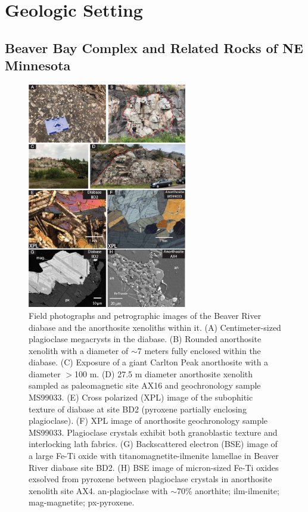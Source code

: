 \section{Geologic Setting}

\subsection{Beaver Bay Complex and Related Rocks of NE Minnesota}

\begin{figure}[h!]
\centering
\noindent\includegraphics[width=0.62\textwidth]{figure/Zhang2021/Field_photo.pdf}
\caption{\footnotesize{Field photographs and petrographic images of the Beaver River diabase and the anorthosite xenoliths within it. (A) Centimeter-sized plagioclase megacrysts in the diabase. (B) Rounded anorthosite xenolith with a diameter of $\sim$7 meters fully enclosed within the diabase. (C) Exposure of a giant Carlton Peak anorthosite with a diameter $>$100 m. (D) 27.5 m diameter anorthosite xenolith sampled as paleomagnetic site AX16 and geochronology sample MS99033. (E) Cross polarized (XPL) image of the subophitic texture of diabase at site BD2 (pyroxene partially enclosing plagioclase). (F) XPL image of anorthosite geochronology sample MS99033. Plagioclase crystals exhibit both granoblastic texture and interlocking lath fabrics. (G) Backscattered electron (BSE) image of a large Fe-Ti oxide with titanomagnetite-ilmenite lamellae in Beaver River diabase site BD2. (H) BSE image of micron-sized Fe-Ti oxides exsolved from pyroxene between plagioclase crystals in anorthosite xenolith site AX4. an-plagioclase with $\sim$70\% anorthite; ilm-ilmenite; mag-magnetite; px-pyroxene.}}
\label{fig:Chap_BBC_Field_photo}
\end{figure}

